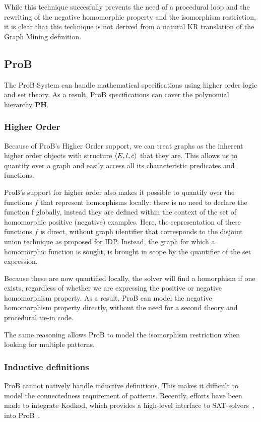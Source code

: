 While this technique succesfully prevents the need of a procedural loop and the rewriting of the negative homomorphic property and the isomorphism restriction, it is clear that this technique is not derived from a natural KR translation of the Graph Mining definition.


\subsection{ProB}
The ProB System can handle mathematical specifications using higher order logic and set theory.
As a result, ProB specifications can cover the polynomial hierarchy \textbf{PH}.

\subsubsection{Higher Order}
Because of ProB's Higher Order support, we can treat graphs as the inherent higher order objects with structure $\langle E,l,c \rangle$ that they are.
This allows us to quantify over a graph and easily access all its characteristic predicates and functions.

ProB's support for higher order also makes it possible to quantify over the functions $f$ that represent homorphisms locally: there is no need to declare the function f globally, instead they are defined within the context of the set of homomorphic positive (negative) examples.
Here, the representation of these functions $f$ is direct, without graph identifier that corresponds to the disjoint union technique as proposed for IDP.
Instead, the graph  for which a homomorphic function is sought, is brought in scope by the quantifier of the set expression.

Because these are now quantified locally, the solver will find a homorphism if one exists, regardless of whether we are expressing the positive or negative homomorphism property.
As a result, ProB can model the negative homomorphism property directly, without the need for a second theory and procedural tie-in code.

The same reasoning allows ProB to model the isomorphism restriction when looking for multiple patterns.
\subsubsection{Inductive definitions}
ProB cannot natively handle inductive definitions.
This makes it difficult to model the connectedness requirement of patterns.
Recently, efforts have been made to integrate Kodkod, which provides a high-level interface to SAT-solvers~\citep{DBLP:conf/tacas/TorlakJ07}, into ProB~\citep{DBLP:conf/fm/PlaggeL12}.


